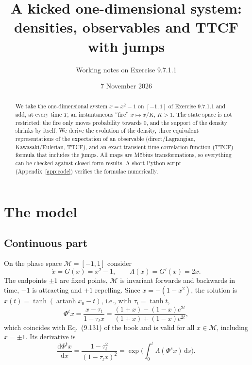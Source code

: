 \documentclass[11pt,a4paper]{article}
\title{A kicked one-dimensional system:\\
densities, observables and TTCF with jumps}
\author{Working notes on Exercise 9.7.1.1}
\date{7 November 2026}
\theoremstyle{remark}
\newcommand{\M}{\mathcal{M}}
\newcommand{\dd}{\mathrm{d}}
\begin{document}
\maketitle

\begin{abstract}
We take the one-dimensional system $\dot x = x^2-1$ on $[-1,1]$ of Exercise
9.7.1.1 and add, at every time $T$, an instantaneous ``fire'' $x\mapsto x/K$,
$K>1$. The state space is not restricted: the fire only moves probability
towards $0$, and the support of the density shrinks by itself. We derive the
evolution of the density, three equivalent representations of the expectation
of an observable (direct/Lagrangian, Kawasaki/Eulerian, TTCF), and an exact
transient time correlation function (TTCF) formula that includes the jumps.
All maps are M\"obius transformations, so everything can be checked against
closed-form results. A short Python script (Appendix~\ref{app:code}) verifies
the formulae numerically.
\end{abstract}

\tableofcontents

\section{The model}

\subsection{Continuous part}
On the phase space $\M=[-1,1]$ consider
\begin{equation}
  \dot x = G(x) = x^2-1, \qquad \Lambda(x) = G'(x) = 2x .
\end{equation}
The endpoints $\pm1$ are fixed points, $\M$ is invariant forwards and
backwards in time, $-1$ is attracting and $+1$ repelling. Since
$\dot x = -(1-x^2)$, the solution is $x(t)=\tanh(\operatorname{artanh}x_0-t)$,
i.e., with $\tau_t=\tanh t$,
\begin{equation}\label{eq:flow}
  \Phi^t x = \frac{x-\tau_t}{1-\tau_t x}
  = \frac{(1+x)-(1-x)e^{2t}}{(1+x)+(1-x)e^{2t}} ,
\end{equation}
which coincides with Eq.~(9.131) of the book and is valid for all
$x\in\M$, including $x=\pm1$. Its derivative is
\begin{equation}\label{eq:flowjac}
  \frac{\dd\Phi^t x}{\dd x} = \frac{1-\tau_t^2}{(1-\tau_t x)^2}
  = \exp\Big(\int_0^t \Lambda(\Phi^s x)\,\dd s\Big) .
\end{equation}
\end{document}
